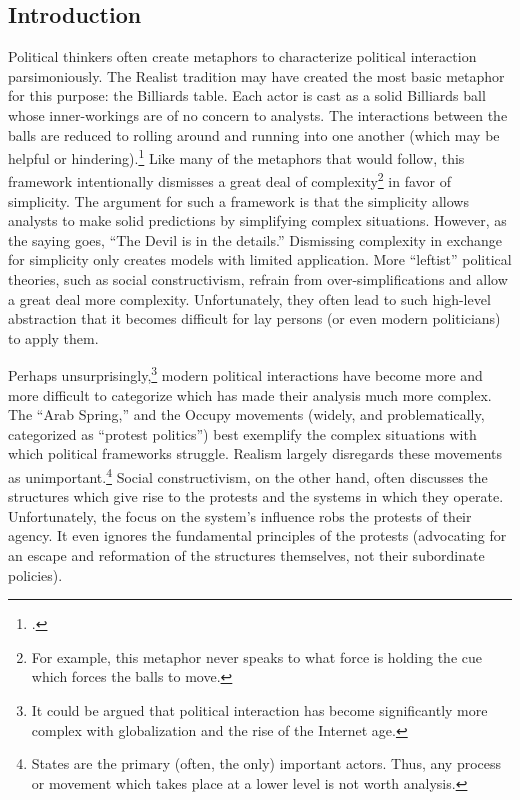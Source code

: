 \documentclass[openany,twoside]{memoir}
\begin{document}
\begin{Spacing}{2}

\chapter{Introduction}
\thispagestyle{fancy}
Political thinkers often create metaphors to characterize political interaction parsimoniously.
The Realist tradition may have created the most basic metaphor for this purpose: the Billiards table.
Each actor is cast as a solid Billiards ball whose inner-workings are of no concern to analysts.
The interactions between the balls are reduced to rolling around and running into one another (which may be helpful or hindering).\footcite{mearsheimer01}
Like many of the metaphors that would follow, this framework intentionally dismisses a great deal of complexity\footnote{
For example, this metaphor never speaks to what force is holding the cue which forces the balls to move.}
in favor of simplicity.
The argument for such a framework is that the simplicity allows analysts to make solid predictions by simplifying complex situations.
However, as the saying goes, ``The Devil is in the details.''
Dismissing complexity in exchange for simplicity only creates models with limited application.
More ``leftist'' political theories, such as social constructivism, refrain from over-simplifications and allow a great deal more complexity.
Unfortunately, they often lead to such high-level abstraction that it becomes difficult for lay persons (or even modern politicians) to apply them.

Perhaps unsurprisingly,\footnote{
It could be argued that political interaction has become significantly more complex with globalization and the rise of the Internet age.}
modern political interactions have become more and more difficult to categorize which has made their analysis much more complex.
The ``Arab Spring,'' and the Occupy movements (widely, and problematically, categorized as ``protest politics'') best exemplify the complex situations with which political frameworks struggle.
Realism largely disregards these movements as unimportant.\footnote{
States are the primary (often, the only) important actors.
Thus, any process or movement which takes place at a lower level is not worth analysis.}
Social constructivism, on the other hand, often discusses the structures which give rise to the protests and the systems in which they operate.
Unfortunately, the focus on the system's influence robs the protests of their agency.
It even ignores the fundamental principles of the protests (advocating for an escape and reformation of the structures themselves, not their subordinate policies).


\end{Spacing}
\end{document}

